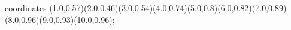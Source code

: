 					coordinates { (1.0,0.57)(2.0,0.46)(3.0,0.54)(4.0,0.74)(5.0,0.8)(6.0,0.82)(7.0,0.89)(8.0,0.96)(9.0,0.93)(10.0,0.96)};
